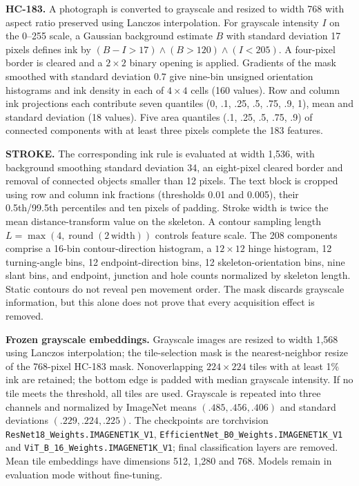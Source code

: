 \documentclass[10pt,a4paper]{article}
\begin{document}
\textbf{HC-183.} A photograph is converted to grayscale and resized to width 768 with aspect ratio preserved using Lanczos interpolation. For grayscale intensity $I$ on the 0--255 scale, a Gaussian background estimate $B$ with standard deviation 17 pixels defines ink by $(B-I>17)\land(B>120)\land(I<205)$. A four-pixel border is cleared and a $2\times2$ binary opening is applied. Gradients of the mask smoothed with standard deviation 0.7 give nine-bin unsigned orientation histograms and ink density in each of $4\times4$ cells (160 values). Row and column ink projections each contribute seven quantiles (0, .1, .25, .5, .75, .9, 1), mean and standard deviation (18 values). Five area quantiles (.1, .25, .5, .75, .9) of connected components with at least three pixels complete the 183 features.

\textbf{STROKE.} The corresponding ink rule is evaluated at width 1,536, with background smoothing standard deviation 34, an eight-pixel cleared border and removal of connected objects smaller than 12 pixels. The text block is cropped using row and column ink fractions (thresholds 0.01 and 0.005), their 0.5th/99.5th percentiles and ten pixels of padding. Stroke width is twice the mean distance-transform value on the skeleton. A contour sampling length $L=\max(4,\operatorname{round}(2\,\mathrm{width}))$ controls feature scale. The 208 components comprise a 16-bin contour-direction histogram, a $12\times12$ hinge histogram, 12 turning-angle bins, 12 endpoint-direction bins, 12 skeleton-orientation bins, nine slant bins, and endpoint, junction and hole counts normalized by skeleton length. Static contours do not reveal pen movement order. The mask discards grayscale information, but this alone does not prove that every acquisition effect is removed.

\textbf{Frozen grayscale embeddings.} Grayscale images are resized to width 1,568 using Lanczos interpolation; the tile-selection mask is the nearest-neighbor resize of the 768-pixel HC-183 mask. Nonoverlapping $224\times224$ tiles with at least 1\% ink are retained; the bottom edge is padded with median grayscale intensity. If no tile meets the threshold, all tiles are used. Grayscale is repeated into three channels and normalized by ImageNet means $(.485,.456,.406)$ and standard deviations $(.229,.224,.225)$. The checkpoints are torchvision \texttt{ResNet18\_Weights.IMAGENET1K\_V1}, \texttt{EfficientNet\_B0\_Weights.IMAGENET1K\_V1} and \texttt{ViT\_B\_16\_Weights.IMAGENET1K\_V1}; final classification layers are removed. Mean tile embeddings have dimensions 512, 1,280 and 768. Models remain in evaluation mode without fine-tuning.
\end{document}
